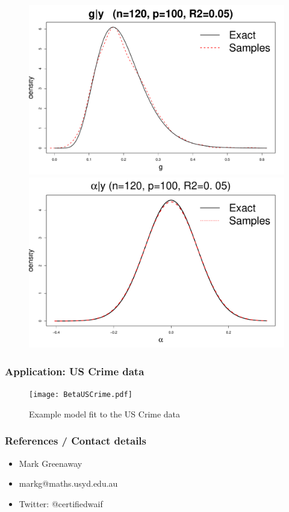 \documentclass{beamer}
\begin{document}
\begin{frame}
\begin{figure}[htp]
		\includegraphics[width=.5\textwidth]{gGivenY.pdf}
		\includegraphics[width=.5\textwidth]{alphaGivenY.pdf}
	\end{figure}
\end{frame}

\begin{frame}
	\frametitle{Application: US Crime data}
	\begin{figure}
		\caption{Example model fit to the US Crime data}
		\texttt{[image: BetaUSCrime.pdf]}
	\end{figure}
\end{frame}

\begin{frame}
	\frametitle{References / Contact details}
	\begin{itemize}
		\item Mark Greenaway
		\item markg@maths.usyd.edu.au
		\item Twitter: @certifiedwaif	
	\end{itemize}

	\small
	
	
\end{frame}
\end{document}
